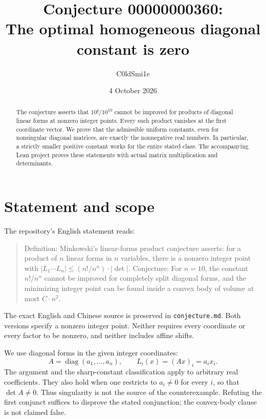 \documentclass[11pt]{article}
\title{Conjecture 00000000360:\\The optimal homogeneous diagonal constant is zero}
\author{C0ldSmi1e}
\date{4 October 2026}
\begin{document}
\maketitle
\begin{abstract}
The conjecture asserts that $10!/10^{10}$ cannot be improved for products of diagonal linear forms at nonzero integer points. Every such product vanishes at the first coordinate vector. We prove that the admissible uniform constants, even for nonsingular diagonal matrices, are exactly the nonnegative real numbers. In particular, a strictly smaller positive constant works for the entire stated class. The accompanying Lean project proves these statements with actual matrix multiplication and determinants.
\end{abstract}

\section{Statement and scope}
The repository's English statement reads:
\begin{quote}
Definition: Minkowski's linear-forms product conjecture asserts: for a product of $n$ linear forms in $n$ variables, there is a nonzero integer point with $|L_1\cdots L_n|\leq (n!/n^n)\cdot|\det|$. Conjecture: For $n=10$, the constant $n!/n^n$ cannot be improved for completely split diagonal forms, and the minimizing integer point can be found inside a convex body of volume at most $C\cdot n^2$.
\end{quote}
The exact English and Chinese source is preserved in \texttt{conjecture.md}. Both versions specify a nonzero integer point. Neither requires every coordinate or every factor to be nonzero, and neither includes affine shifts.

We use diagonal forms in the given integer coordinates:
\[
 A=\operatorname{diag}(a_1,\ldots,a_n),\qquad L_i(x)=(Ax)_i=a_i x_i.
\]
The argument and the sharp-constant classification apply to arbitrary real coefficients. They also hold when one restricts to $a_i\ne0$ for every $i$, so that $\det A\ne0$. Thus singularity is not the source of the counterexample. Refuting the first conjunct suffices to disprove the stated conjunction; the convex-body clause is not claimed false.
\end{document}

